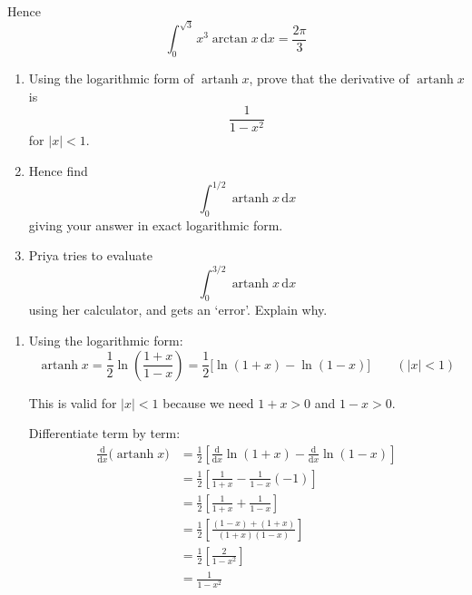 \documentclass[leqno]{article}
\begin{document}
\begin{enumerate}[
  label=\textbf{\arabic*.},
  leftmargin=*,
  topsep=0pt,
  partopsep=0pt,
  parsep=0pt
]
\begin{djsSolution}
\begin{enumerate}[label=\textbf{(\alph*)}]
  Hence
  \[
  \int_0^{\sqrt3} x^3\arctan x\,\mathrm{d}x=\frac{2\pi}{3}
  \]
\end{enumerate}
\end{djsSolution}


\newpage

\questionitem

\begin{enumerate}[label=\textbf{(\alph*)}]
  \item Using the logarithmic form of $\operatorname{artanh} x$, prove that the derivative of $\operatorname{artanh} x$ is
  \[
  \frac{1}{1-x^2}
  \]
  for $|x|<1$.  \\
  \item Hence find
  \[
  \int_0^{1/2} \operatorname{artanh} x\,\mathrm{d}x
  \]
  giving your answer in exact logarithmic form.  \\
  \item Priya tries to evaluate
  \[
  \int_0^{3/2} \operatorname{artanh} x\,\mathrm{d}x
  \]
  using her calculator, and gets an `error'. Explain why.  \\
\end{enumerate}

\vspace*{10pt}

\begin{djsSolution}
\begin{enumerate}[label=\textbf{(\alph*)}]
  \item Using the logarithmic form:
\[
\operatorname{artanh} x=\frac12\ln\left(\frac{1+x}{1-x}\right)=\frac12\bigl[\ln(1+x)-\ln(1-x)\bigr]\qquad (|x|<1)
\]

This is valid for \(|x|<1\) because we need \(1+x>0\) and \(1-x>0\).

Differentiate term by term:
\begin{align*}
\frac{\mathrm{d}}{\mathrm{d}x}\bigl(\operatorname{artanh} x\bigr)
&=\frac12\left[\frac{\mathrm{d}}{\mathrm{d}x}\ln(1+x)-\frac{\mathrm{d}}{\mathrm{d}x}\ln(1-x)\right] \\
&=\frac12\left[\frac{1}{1+x}-\frac{1}{1-x}(-1)\right] \\
&=\frac12\left[\frac{1}{1+x}+\frac{1}{1-x}\right] \\
&=\frac12\left[\frac{(1-x)+(1+x)}{(1+x)(1-x)}\right] \\
&=\frac12\left[\frac{2}{1-x^2}\right] \\
&=\frac{1}{1-x^2}
\end{align*}


\end{enumerate}
\end{djsSolution}
\end{enumerate}
\end{document}
